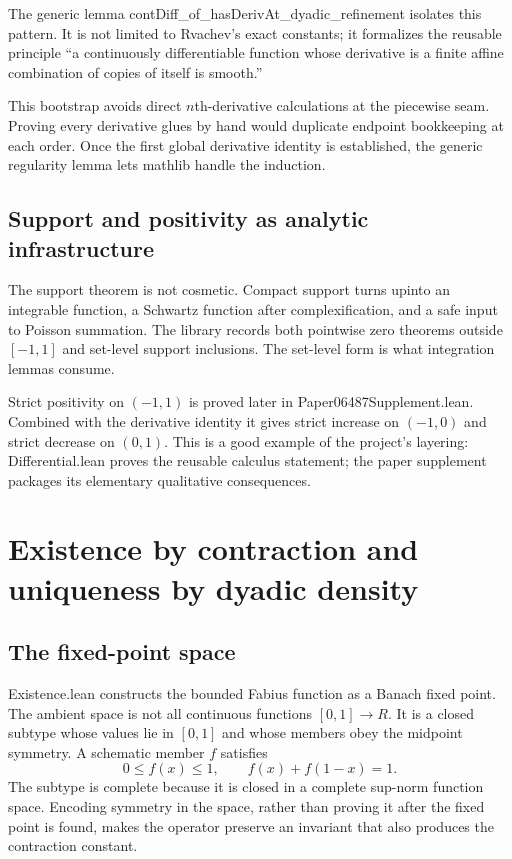 \documentclass[11pt,a4paper,openany]{book}
\def\module#1{#1.lean}
\def\decl#1{#1}
\def\upfun{up}
\def\R{R}
\newcommand{\R}{\ensuremath{\mathbb{R}}}
\newcommand{\upfun}{\ensuremath{\operatorname{up}}}
\newcommand{\module}[1]{\nolinkurl{#1.lean}}
\newcommand{\decl}[1]{\texttt{\detokenize{#1}}}
\begin{document}
The generic lemma
\decl{contDiff_of_hasDerivAt_dyadic_refinement} isolates this pattern.  It is
not limited to Rvachev's exact constants; it formalizes the reusable principle
“a continuously differentiable function whose derivative is a finite affine
combination of copies of itself is smooth.”

\begin{engineering}
This bootstrap avoids direct $n$th-derivative calculations at the piecewise
seam.  Proving every derivative glues by hand would duplicate endpoint
bookkeeping at each order.  Once the first global derivative identity is
established, the generic regularity lemma lets mathlib handle the induction.
\end{engineering}

\section{Support and positivity as analytic infrastructure}
The support theorem is not cosmetic.  Compact support turns \upfun into an
integrable function, a Schwartz function after complexification, and a safe
input to Poisson summation.  The library records both pointwise zero theorems
outside $[-1,1]$ and set-level support inclusions.  The set-level form is what
integration lemmas consume.

Strict positivity on $(-1,1)$ is proved later in
\module{Paper06487Supplement}.  Combined with the derivative identity it gives
strict increase on $(-1,0)$ and strict decrease on $(0,1)$.  This is a good
example of the project's layering: \module{Differential} proves the reusable
calculus statement; the paper supplement packages its elementary qualitative
consequences.

\chapter[Existence by contraction and uniqueness by dyadic density]{Existence by contraction and\\uniqueness by dyadic density}
\label{ch:existence}

\section{The fixed-point space}
\module{Existence} constructs the bounded Fabius function as a Banach fixed
point.  The ambient space is not all continuous functions $[0,1]\to\R$.
It is a closed subtype whose values lie in $[0,1]$ and whose members obey the
midpoint symmetry.  A schematic member $f$ satisfies
\[
 0\le f(x)\le1,
 \qquad f(x)+f(1-x)=1.
\]
The subtype is complete because it is closed in a complete sup-norm function
space.  Encoding symmetry in the space, rather than proving it after the fixed
point is found, makes the operator preserve an invariant that also produces
the contraction constant.
\end{document}

